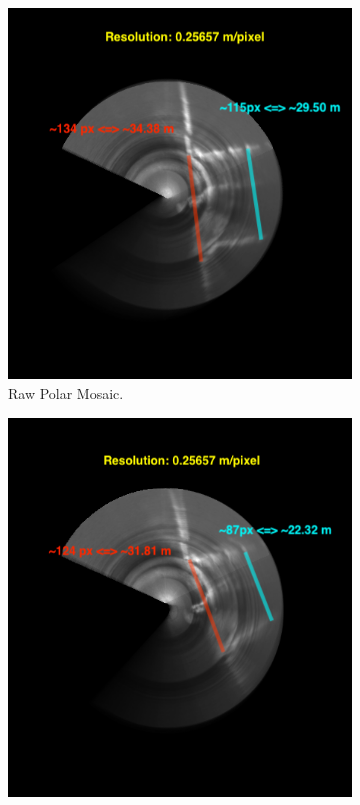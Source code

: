 \begin{figure}[H]
    \centering
    \begin{subfigure}[b]{0.47\textwidth}
        \centering
        \includegraphics[width=\textwidth]{figures/results/Real/Example2/PC-Annotated.png}
        \caption{Raw Polar Mosaic.}
    \end{subfigure}
    \hfill
    \begin{subfigure}[b]{0.47\textwidth}
        \centering
        \includegraphics[width=\textwidth]{figures/results/Real/Example2/FMT-Annotated.png}

\end{subfigure}
\end{figure}
